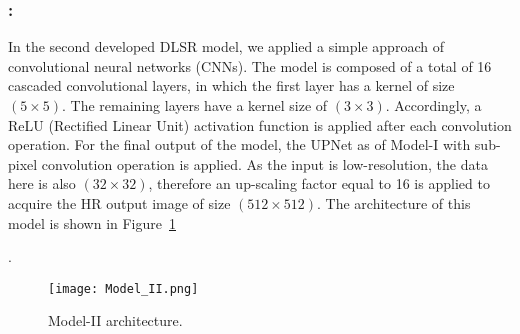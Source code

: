 \subsubsection{\DIFdelbegin {}\DIFdelend \DIFaddbegin {}\DIFaddend :}
In the second developed DLSR model, we applied a simple approach of convolutional neural networks (CNNs). 
The model is composed of a total of 16 cascaded convolutional layers, in which the first layer has a kernel of size \((5\times 5)\).
The remaining layers have a kernel size of \((3\times 3)\). 
Accordingly, a ReLU (Rectified Linear Unit) activation function is applied 
after each convolution operation.
For the final output of the model, the UPNet as of Model-I with sub-pixel convolution operation is applied. 
As the input is low-resolution, the data here is also \((32\times 32)\), therefore an up-scaling factor equal to 16 is applied to acquire the HR output image of size \((512\times 512)\). 
The architecture of this model is shown in Figure~\ref{fig:Model_II}\DIFaddbegin {}

\DIFaddend .
\begin{figure} [ht!]
	\begin{center}
		\texttt{[image: Model\_II.png]}
	\end{center}
	\caption{Model-II architecture.} 
	\label{fig:Model_II}
\end{figure}
